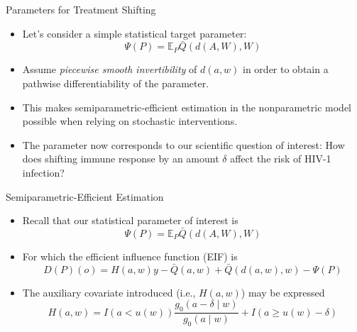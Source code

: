 \documentclass[12pt,t]{beamer}
\newcommand{\E}{\mathbb{E}}
\begin{document}
\begin{frame}[c]{Parameters for Treatment Shifting}

\begin{center}
\begin{itemize}
  \itemsep10pt
  \item Let's consider a simple statistical target parameter:
    \[
      \Psi(P) = \E_P{\bar{Q}(d(A, W), W)}
    \]
  \item Assume \textit{piecewise smooth invertibility} of $d(a,w)$ in order to
    obtain a pathwise differentiability of the parameter.
  \item This makes semiparametric-efficient estimation in the nonparametric
    model possible when relying on stochastic interventions.
  \item The parameter now corresponds to our scientific question of interest:
    How does shifting immune response by an amount $\delta$ affect the risk of
    HIV-1 infection?
\end{itemize}
\end{center}


\end{frame}


\begin{frame}[c]{Semiparametric-Efficient Estimation}

\begin{center}
\begin{itemize}
  \itemsep10pt
  \item Recall that our statistical parameter of interest is
    \[
      \Psi(P) = \E_P{\bar{Q}(d(A, W), W)}
    \]
  \item For which the efficient influence function (EIF) is
    \[
      D(P)(o) = H(a, w){y - \bar{Q}(a, w)} + \bar{Q}(d(a, w), w) - \Psi(P)
    \]
  \item The auxiliary covariate introduced (i.e., $H(a,w)$) may be expressed
    \[
      H(a,w) = I(a < u(w)) \frac{g_0(a - \delta \mid w)}{g_0(a \mid w)} + I(a
      \geq u(w) - \delta)
    \]
\end{itemize}
\end{center}


\end{frame}
\end{document}
